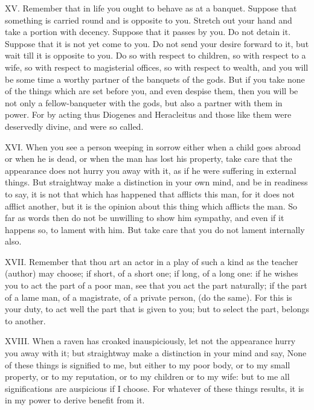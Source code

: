 XV. Remember that in life you ought to behave as at a banquet. Suppose that something is carried round and is opposite to you. Stretch out your hand and take a portion with decency. Suppose that it passes by you. Do not detain it. Suppose that it is not yet come to you. Do not send your desire forward to it, but wait till it is opposite to you. Do so with respect to children, so with respect to a wife, so with respect to magisterial offices, so with respect to wealth, and you will be some time a worthy partner of the banquets of the gods. But if you take none of the things which are set before you, and even despise them, then you will be not only a fellow-banqueter with the gods, but also a partner with them in power. For by acting thus Diogenes and Heracleitus and those like them were deservedly divine, and were so called.



XVI. When you see a person weeping in sorrow either when a child goes abroad or when he is dead, or when the man has lost his property, take care that the appearance does not hurry you away with it, as if he were suffering in external things. But straightway make a distinction in your own mind, and be in readiness to say, it is not that which has happened that afflicts this man, for it does not afflict another, but it is the opinion about this thing which afflicts the man. So far as words then do not be unwilling to show him sympathy, and even if it happens so, to lament with him. But take care that you do not lament internally also.



XVII. Remember that thou art an actor in a play of such a kind as the teacher (author) may choose; if short, of a short one; if long, of a long one: if he wishes you to act the part of a poor man, see that you act the part naturally; if the part of a lame man, of a magistrate, of a private person, (do the same). For this is your duty, to act well the part that is given to you; but to select the part, belongs to another.



XVIII. When a raven has croaked inauspiciously, let not the appearance hurry you away with it; but straightway make a distinction in your mind and say, None of these things is signified to me, but either to my poor body, or to my small property, or to my reputation, or to my children or to my wife: but to me all significations are auspicious if I choose. For whatever of these things results, it is in my power to derive benefit from it.



